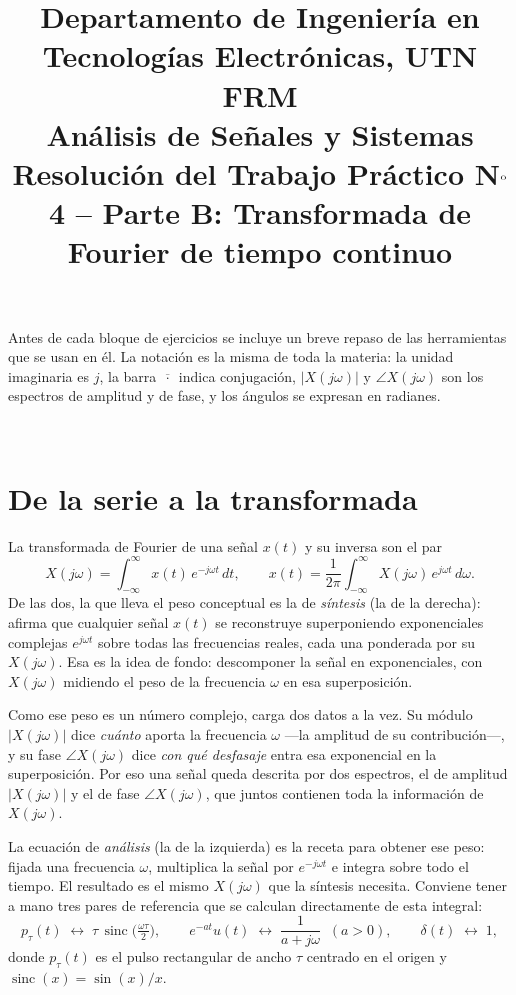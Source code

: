 \documentclass[10pt,a4paper]{article}
\title{%
	{\normalsize Departamento de Ingeniería en Tecnologías Electrónicas, UTN FRM}\\[0.1cm]
	{\large Análisis de Señales y Sistemas}\\[0.15cm]
	{\normalsize Resolución del Trabajo Práctico N$^{\text o}$4 -- Parte B: Transformada de Fourier de tiempo continuo}%
}
\author{}
\date{}
\newcommand{\tema}[1]{%
  \bigskip
  \noindent{\color{utnblue}\rule{\linewidth}{1pt}}\\[-0.4em]
  \section*{#1}
  \vspace{-0.6em}
}
\begin{document}
	\maketitle
	\thispagestyle{fancy}

	\label{sec:resolucion}

	\noindent
	Antes de cada bloque de ejercicios se incluye un breve repaso de las herramientas que se usan en él. La notación es la misma de toda la materia: la unidad imaginaria es $j$, la barra $\overline{\,\cdot\,}$ indica conjugación, $|X(j\omega)|$ y $\angle X(j\omega)$ son los espectros de amplitud y de fase, y los ángulos se expresan en radianes.

	\tema{De la serie a la transformada}

	La transformada de Fourier de una señal $x(t)$ y su inversa son el par
	\[
		X(j\omega) = \int_{-\infty}^{\infty} x(t)\,e^{-j\omega t}\,dt,
		\qquad
		x(t) = \frac{1}{2\pi}\int_{-\infty}^{\infty} X(j\omega)\,e^{j\omega t}\,d\omega.
	\]
	De las dos, la que lleva el peso conceptual es la de \emph{síntesis} (la de la derecha): afirma que cualquier señal $x(t)$ se reconstruye superponiendo exponenciales complejas $e^{j\omega t}$ sobre todas las frecuencias reales, cada una ponderada por su $X(j\omega)$. Esa es la idea de fondo: descomponer la señal en exponenciales, con $X(j\omega)$ midiendo el peso de la frecuencia $\omega$ en esa superposición.

	Como ese peso es un número complejo, carga dos datos a la vez. Su módulo $|X(j\omega)|$ dice \emph{cuánto} aporta la frecuencia $\omega$ ---la amplitud de su contribución---, y su fase $\angle X(j\omega)$ dice \emph{con qué desfasaje} entra esa exponencial en la superposición. Por eso una señal queda descrita por dos espectros, el de amplitud $|X(j\omega)|$ y el de fase $\angle X(j\omega)$, que juntos contienen toda la información de $X(j\omega)$.

	La ecuación de \emph{análisis} (la de la izquierda) es la receta para obtener ese peso: fijada una frecuencia $\omega$, multiplica la señal por $e^{-j\omega t}$ e integra sobre todo el tiempo. El resultado es el mismo $X(j\omega)$ que la síntesis necesita. Conviene tener a mano tres pares de referencia que se calculan directamente de esta integral:
	\[
		p_\tau(t) \;\leftrightarrow\; \tau\,\operatorname{sinc}\!\Big(\tfrac{\omega\tau}{2}\Big),
		\qquad
		e^{-at}u(t) \;\leftrightarrow\; \frac{1}{a+j\omega}\;\;(a>0),
		\qquad
		\delta(t) \;\leftrightarrow\; 1,
	\]
	donde $p_\tau(t)$ es el pulso rectangular de ancho $\tau$ centrado en el origen y $\operatorname{sinc}(x)=\sin(x)/x$.
\end{document}
